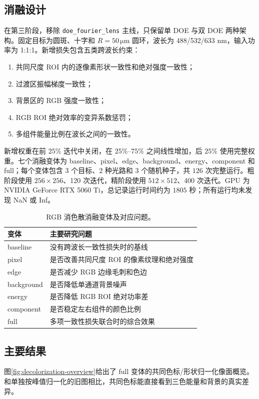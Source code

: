 \documentclass[UTF8,a4paper,12pt]{ctexart}
\newcommand{\um}{\si{\micro\meter}}
\begin{document}
\subsection{消融设计}
在第三阶段，移除 \texttt{doe\_fourier\_lens} 主线，只保留单 DOE 与双 DOE 两种架构。固定目标为圆斑、十字和 $R=50\,\um$ 圆环，波长为 488/532/633 nm，输入功率为 1:1:1。新增损失包含五类跨波长约束：
\begin{enumerate}
\item 共同尺度 ROI 内的逐像素形状一致性和绝对强度一致性；
\item 过渡区振幅梯度一致性；
\item 背景区的 RGB 强度一致性；
\item RGB ROI 绝对效率的变异系数惩罚；
\item 多组件能量比例在波长之间的一致性。
\end{enumerate}
新增权重在前 $25\%$ 迭代中关闭，在 $25\%$--$75\%$ 之间线性增加，后 $25\%$ 使用完整权重。七个消融变体为 baseline、pixel、edge、background、energy、component 和 full；每个变体包含 $3$ 个目标、$2$ 种光路和 $3$ 个随机种子，共 $126$ 次完整运行。粗阶段使用 $256\times256$、120 次迭代，精阶段使用 $512\times512$、400 次迭代。GPU 为 NVIDIA GeForce RTX 5060 Ti，总记录运行时间约为 $1805$ 秒；所有运行均未发现 NaN 或 Inf。

\begin{table}[H]
\centering
\caption{RGB 消色散消融变体及对应问题。}
\label{tab:ablation-groups}
\begin{tabular}{ll}
\toprule
变体 & 主要研究问题 \\
\midrule
baseline & 没有跨波长一致性损失时的基线 \\
pixel & 是否改善共同尺度 ROI 的像素纹理和绝对强度 \\
edge & 是否减少 RGB 边缘毛刺和色边 \\
background & 是否降低单通道背景噪声 \\
energy & 是否降低 RGB ROI 绝对功率差 \\
component & 是否稳定左右组件的颜色比例 \\
full & 多项一致性损失联合时的综合效果 \\
\bottomrule
\end{tabular}
\end{table}

\subsection{主要结果}
图\ref{fig:decolorization-overview}给出了 full 变体的共同色标/形状归一化像面概览。和单独按峰值归一化的旧图相比，共同色标能直接看到三色能量和背景的真实差异。
\end{document}
